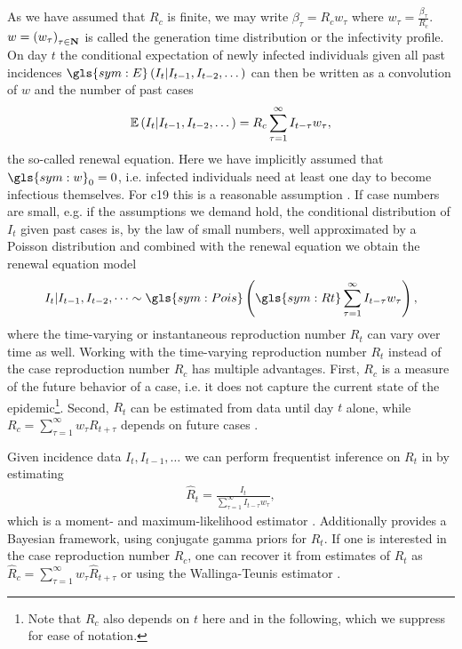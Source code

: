 As we have assumed that $R_{c}$ is finite, we may write $\beta_{\tau} = R_{c}w_{\tau}$ where $w_{\tau} = \frac{\beta_{\tau}}{R_{c}}$. $w = \left( w_{\tau} \right)_{\tau \in \mathbf N}$ is called the generation time distribution or the infectivity profile. On day $t$ the conditional expectation of newly infected individuals given all past incidences $\gls{sym:E} \left(I_{t}| I_{t - 1}, I_{t - 2}, \dots \right)$  can then be written as a convolution of $w$ and the number of past cases 
\begin{align}
    \label{eq:renewal-eq}
\mathbb E \left(I_{t}| I_{t - 1}, I_{t - 2}, \dots \right) = R_{c} \sum_{\tau = 1}^\infty I_{t - \tau} w_{\tau},
\end{align}
the so-called renewal equation. Here we have implicitly assumed that $\gls{sym:w}_{0} = 0$, i.e. infected individuals need at least one day to become infectious themselves. For \acrshort{c19} this is a reasonable assumption \citep{Lauer2020Incubation}. If case numbers are small, e.g. if the assumptions we demand hold, the conditional distribution of $I_{t}$ given past cases is, by the law of small numbers, well approximated by a Poisson distribution and combined with the renewal equation we obtain the renewal equation model \citep{Fraser2007Estimating}
\begin{align}
    \label{eq:renewal-model}
    I_{t} | I_{t - 1}, I_{t - 2}, \dots \sim \gls{sym:Pois} \left( \gls{sym:Rt} \sum _{\tau = 1}^\infty I_{t - \tau} w_{\tau} \right),
\end{align}
where the time-varying or instantaneous reproduction number $R_{t}$ can vary over time as well. Working with the time-varying reproduction number $R_{t}$ instead of the case reproduction number $R_{c}$ has multiple advantages. 
First, $R_{c}$ is a measure of the future behavior of a case, i.e. it does not capture the current state of the epidemic\footnote{Note that $R_{c}$ also depends on $t$ here and in the following, which we suppress for ease of notation.}. 
Second, $R_{t}$ can be estimated from data until day $t$ alone, while $R_{c} = \sum_{\tau = 1}^{\infty} w_{\tau} R_{ t + \tau }$ depends on future cases \citep{Fraser2007Estimating}.


Given incidence data $I_{t}, I_{t - 1}, \dots $ we can perform frequentist inference on $R_{t}$ in  by estimating
\begin{align}
    \label{eq:hatR}
    \hat R_{t} = \frac{I_{t}}{\sum_{\tau = 1}^{\infty} I_{t - \tau} w_{\tau}},
\end{align}
which is a moment- and maximum-likelihood estimator \citep{Hotz2020Monitoring}. Additionally \citep{Cori2021EpiEstim} provides a Bayesian framework, using conjugate gamma priors for $R_{t}$. If one is interested in the case reproduction number $R_{c}$, one can recover it from estimates of $R_{t}$ as $\hat R_{c} = \sum_{\tau = 1}^\infty w_{\tau} \hat R_{t + \tau}$ or using the Wallinga-Teunis estimator \citep{Wallinga2004Different}.


